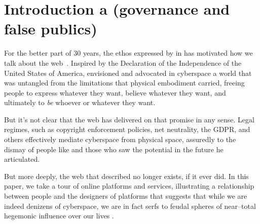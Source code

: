 \documentclass[main]{subfiles}
\begin{document}
\section{Introduction a (governance and false publics)}\label{sec:introduction a}


{For the better part of 30 years, the ethos expressed by \citeauthor{barlow2009declaration} in \citeyear{barlow2009declaration}
has motivated how we talk about the web~\cite{barlow2009declaration}.}
Inspired by the Declaration of the Independence of the United States of America, \citeauthor{barlow2009declaration}
envisioned and advocated in cyberspace a world that was untangled from the limitations that physical embodiment carried,
freeing people to express whatever they want, believe whatever they want, and ultimately to \textit{be} whoever or whatever they want. 






{But it's not clear that the web has delivered on that promise in any sense.}
Legal regimes, such as copyright enforcement policies, net neutrality, the GDPR, and others effectively mediate cyberspace from physical space, assuredly to the dismay of people like \citeauthor{barlow2009declaration} and those who saw the potential in the future he articulated.

But more deeply, the web that \citeauthor{barlow2009declaration} described no longer exists, if it ever did.
In this paper, we take a tour of online platforms and services, illustrating a relationship between people and the designers of platforms that suggests that while we are indeed denizens of cyberspace, we are in fact serfs to feudal spheres of near--total hegemonic influence over our lives .
\end{document}
